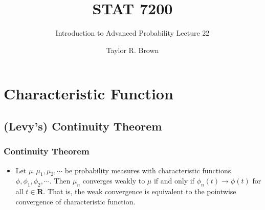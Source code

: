 \documentclass[handout]{beamer}
\title{STAT 7200}
\subtitle{Introduction to Advanced Probability \newline Lecture 22}
\author{Taylor R. Brown}
\institute{}
\date{}
\begin{document}
\frame{\titlepage}


\section[Outline]{}
\frame{\tableofcontents}



\section{Characteristic Function}


\subsection{(Levy's) Continuity Theorem} 


\frame
{
  \frametitle{Continuity Theorem} 

 \begin{itemize}
 
            \item<1->[] \begin{Theorem} Let $\mu, \mu_1, \mu_2,\cdots$  be probability measures with characteristic functions $\phi, \phi_1, \phi_2,\cdots$. Then $\mu_n$ converges weakly to $\mu$ if and only if $\phi_n(t)\rightarrow \phi(t)$ for all $t \in \mathbf{R}$.  That is, the weak convergence is equivalent to the pointwise convergence of characteristic function. \end{Theorem}

% 

\end{itemize}
}
\end{document}

